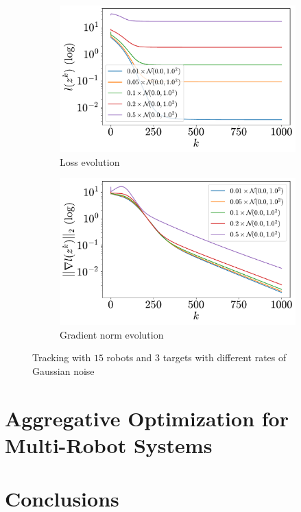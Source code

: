 \documentclass[a4paper,11pt,oneside]{book}
\begin{document}
\begin{figure}[htb!]
      \centering
      \begin{subfigure}[t]{0.46\linewidth}
            \centering
            \includegraphics[width=\linewidth]{./figs/tracking/rates/loss.pdf} 
            \caption{Loss evolution}
      \end{subfigure}
      \hfill
      \begin{subfigure}[t]{0.46\linewidth}
            \centering
            \includegraphics[width=\linewidth]{./figs/tracking/rates/gradient.pdf} 
            \caption{Gradient norm evolution}
      \end{subfigure}
      \caption{Tracking with $15$ robots and $3$ targets with different rates of Gaussian noise}
      \label{fig:tracking_rates_15_3}
\end{figure}


\chapter{Aggregative Optimization for Multi-Robot Systems}





\chapter*{Conclusions}



{}

\end{document}
